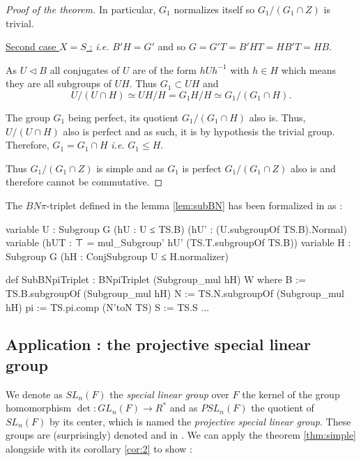 \begin{proof}[Proof of the theorem]
     In particular, $G_1$ normalizes itself so $G_1 / \left( G_1 \cap Z \right)$ is trivial.

    \underline {Second case $X = S$ :} \textit{i.e.} $B'H = G'$ and so $G = G'T= B'HT = HB'T = HB.$

       As $U \triangleleft B$ all conjugates of $U$ are of the form $h U h^{-1}$ with $h \in  H$ which means they are all subgroups of $UH$. Thus $G_1 \subset UH$ and 
       $$U / \left( U \cap  H \right) \simeq UH / H = G_1H / H \simeq G_1 / \left( G_1 \cap H \right).$$

The group $G_1$ being perfect, its quotient $G_1 / \left( G_1 \cap H \right)$ also is. Thus, $U / (U \cap H)$ also is perfect and as such, it is by hypothesis the trivial group. Therefore, $G_1 = G_1 \cap H$ \textit{i.e.} $ G_1 \le H$.

Thus $G_1 / \left( G_1 \cap Z \right)$ is simple and as $G_1$ is perfect $G_1 / \left( G_1 \cap Z \right)$ also is and therefore cannot be commutative.
\end{proof}


\begin{remark}
    The $BN\pi$-triplet defined in the lemma \ref{lem:subBN} has been formalized in \Lean as :

\begin{leancode}
variable {U : Subgroup G} (hU : U ≤ TS.B) (hU' : (U.subgroupOf TS.B).Normal)
variable (hUT : ⊤ = mul_Subgroup' hU' (TS.T.subgroupOf TS.B))
variable {H : Subgroup G} (hH : ConjSubgroup U ≤ H.normalizer)

def SubBNpiTriplet : BNpiTriplet (Subgroup_mul  hH) W where
  B := TS.B.subgroupOf (Subgroup_mul hH)
  N := TS.N.subgroupOf (Subgroup_mul hH)
  pi := TS.pi.comp (N'toN TS)
  S := TS.S
  ... 
\end{leancode}
\end{remark}

\subsection{Application : the projective special linear group}

We denote as $SL_n(F)$ the \emph{special linear group} over $F$  the kernel of the group homomorphism $\det : GL_n(F) \to R^*$ and as $PSL_n(F)$ the quotient of $SL_n(F)$ by its center, which is named the \emph{projective special linear group}.
These groups are (surprisingly) denoted  and  in \Lean. We can apply the theorem \ref{thm:simple} alongside with its corollary \ref{cor:2} to show : 

